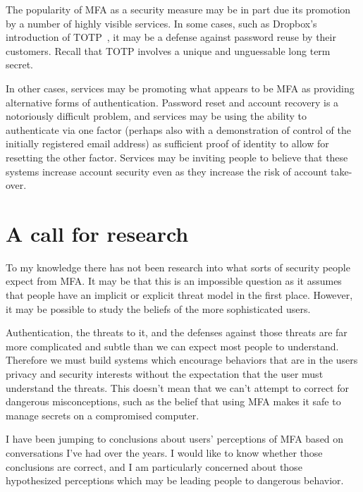 \documentclass{soups}
\begin{document}
The popularity of MFA as a security measure may be in part due its promotion by a number of highly visible services.
In some cases,
such as Dropbox's introduction of TOTP~\autocite{Dropbox12:reuse},
it may be a defense against password reuse by their customers.
Recall that TOTP involves a unique and unguessable long term secret.

In other cases, services may be promoting what appears to be MFA as providing
alternative forms of authentication. 
Password reset and account recovery is a notoriously difficult problem,
and services may be using the ability to authenticate via one factor 
(perhaps also with a demonstration of control of the initially registered email address)
as sufficient proof of identity to allow for resetting the other factor.
Services may be inviting people to believe that these systems increase account security even as they increase the risk of account take-over.

\section{A call for research}

To my knowledge there has not been research into what sorts of security people expect from MFA\@.
It may be that this is an impossible question as it assumes that people
have an implicit or explicit threat model in the first place.
However, it may be possible to study the beliefs of the more sophisticated users.

Authentication, the threats to it, and the defenses against those threats are far more complicated and subtle than we can expect most people to understand.
Therefore we must build systems which encourage behaviors that are in the users
privacy and security interests without the expectation that the user must understand the threats.
This doesn't mean that we can't attempt to correct for dangerous misconceptions,
such as the belief that using MFA makes it safe to manage secrets on a compromised computer.

I have been jumping to conclusions about users' perceptions of MFA based on 
conversations I've had over the years.
I would like to know whether those conclusions are correct,
and I am particularly concerned about those hypothesized perceptions which may be leading
people to dangerous behavior.

%
%
\printbibliography[title={REFERENCES},heading=bibnumbered]
\end{document}
